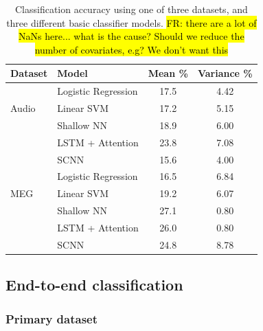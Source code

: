 \documentclass[utf8]{frontiersSCNS} %
\newcommand{\FR}[1]{{\small \textcolor{red}{\hl{FR: #1}}}}
\begin{document}
\begin{table}[t]
  \centering
  \label{tab:feat_results}
  \begin{tabular}{l l | c | c}
    \toprule
    \textbf{Dataset} & \textbf{Model} & \textbf{Mean \%} & \textbf{Variance \%} \\
    \toprule
    \multirow{3}{*}{Audio}
                     & Logistic Regression & 17.5 & 4.42  \\
                     & Linear SVM          & 17.2 & 5.15  \\
                     & Shallow NN          & 18.9 & 6.00  \\
                     & LSTM + Attention    & 23.8 & 7.08  \\
                     & SCNN                & 15.6 & 4.00  \\
    \midrule
    \multirow{3}{*}{MEG}
                     & Logistic Regression & 16.5 & 6.84  \\
                     & Linear SVM          & 19.2 & 6.07  \\
                     & Shallow NN          & 27.1 & 0.80  \\
                     & LSTM + Attention    & 26.0 & 0.80  \\
                     & SCNN                & 24.8 & 8.78  \\
    \bottomrule
  \end{tabular}
  \caption{Classification accuracy using one of three datasets, and three different basic classifier models. \FR{there are a lot of NaNs here... what is the cause? Should we reduce the number of covariates, e.g? We don't want this}}
\end{table}


\subsection{End-to-end classification}

\subsubsection{Primary dataset}
\end{document}
